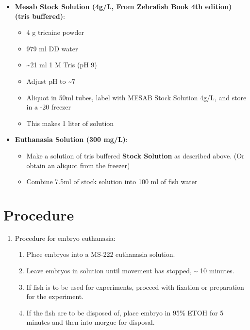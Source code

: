 \documentclass[
  letterpaper,
  DIV=11,
  numbers=noendperiod]{scrreprt}
\providecommand{\tightlist}{%
  \setlength{\itemsep}{0pt}\setlength{\parskip}{0pt}}\usepackage{longtable,booktabs,array}
\begin{document}
\begin{itemize}
\item
  \textbf{Mesab Stock Solution (4g/L, From Zebrafish Book 4th edition)
  (tris buffered)}:

  \begin{itemize}
  \tightlist
  \item
    4 g tricaine powder
  \item
    979 ml DD water
  \item
    \textasciitilde21 ml 1 M Tris (pH 9)
  \item
    Adjust pH to \textasciitilde7
  \item
    Aliquot in 50ml tubes, label with MESAB Stock Solution 4g/L, and
    store in a -20 freezer
  \item
    This makes 1 liter of solution
  \end{itemize}
\item
  \textbf{Euthanasia Solution (300 mg/L)}:

  \begin{itemize}
  \tightlist
  \item
    Make a solution of tris buffered \textbf{Stock Solution} as
    described above. (Or obtain an aliquot from the freezer)
  \item
    Combine 7.5ml of stock solution into 100 ml of fish water
  \end{itemize}
\end{itemize}

\hypertarget{procedure-38}{%
\section{Procedure}\label{procedure-38}}

\begin{enumerate}
\def\labelenumi{\arabic{enumi}.}
\item
  Procedure for embryo euthanasia:

  \begin{enumerate}
  \def\labelenumii{\arabic{enumii}.}
  \tightlist
  \item
    Place embryos into a MS-222 euthanasia solution.
  \item
    Leave embryos in solution until movement has stopped,
    \textasciitilde{} 10 minutes.
  \item
    If fish is to be used for experiments, proceed with fixation or
    preparation for the experiment.
  \item
    If the fish are to be disposed of, place embryo in 95\% ETOH for 5
    minutes and then into morgue for disposal.
  \end{enumerate}
\end{enumerate}
\end{document}
